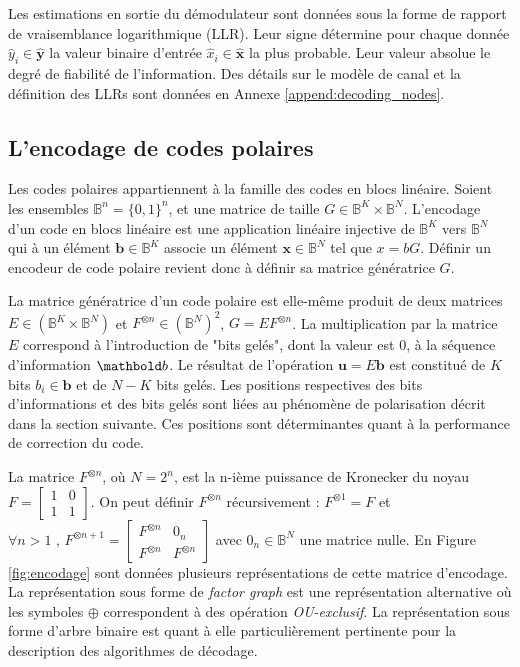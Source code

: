 Les estimations en sortie du démodulateur sont données sous la forme de rapport de vraisemblance logarithmique (LLR). Leur signe détermine pour chaque donnée $\hat{y}_i \in \mathbold{\hat{y}}$ la valeur binaire d'entrée $\hat{x}_i \in \mathbold{\hat{x}}$ la plus probable. Leur valeur absolue le degré de fiabilité de l'information. Des détails sur le modèle de canal et la définition des LLRs sont données en Annexe \ref{append:decoding_nodes}.

\subsection{L'encodage de codes polaires}
Les codes polaires appartiennent à la famille des codes en blocs linéaire. Soient les ensembles $\mathbb{B}^n = \{0,1\}^n$, et  une matrice de taille $G \in \mathbb{B}^K \times \mathbb{B}^N$. L'encodage d'un code en blocs linéaire est une application linéaire injective de $\mathbb{B}^K$ vers $\mathbb{B}^N$ qui à un élément $\mathbold{b} \in \mathbb{B}^K$ associe un élément $\mathbold{x} \in \mathbb{B}^N$ tel que $x=bG$. Définir un encodeur de code polaire revient donc à définir sa matrice génératrice $G$. 

La matrice génératrice d'un code polaire est elle-même produit de deux matrices $E \in (\mathbb{B}^K \times \mathbb{B}^N)$ et $F^{\otimes n}\in (\mathbb{B}^N)^2$, $G=EF^{\otimes n}$. La multiplication par la matrice $E$ correspond à l'introduction de "bits gelés", dont la valeur est $0$, à la séquence d'information $\mb{b}$. Le résultat de l'opération $\mathbold{u} = E\mathbold{b}$ est constitué de $K$ bits $b_i \in \mathbold{b}$ et de $N-K$ bits gelés. Les positions respectives des bits d'informations et des bits gelés sont liées au phénomène de polarisation décrit dans la section suivante. Ces positions sont déterminantes quant à la performance de correction du code.

La matrice $F^{\otimes n}$, où $N=2^n$, est la n-ième puissance de Kronecker du noyau $F=\left[\begin{smallmatrix} 1 & 0 \\ 1 & 1\end{smallmatrix}\right]$. On peut définir $F^{\otimes n}$ récursivement : $F^{\otimes 1} = F$ et $\forall {n > 1}\text{ , }{F^{\otimes n + 1}=\left[\begin{smallmatrix} F^{\otimes n} & 0_n \\ F^{\otimes n} & F^{\otimes n}\end{smallmatrix}\right]}$ avec $0_n \in \mathbb{B}^N$ une matrice nulle.   En Figure \ref{fig:encodage} sont données plusieurs représentations de cette matrice d'encodage. La représentation sous forme de \textit{factor graph} est une représentation alternative où les symboles $\oplus$ correspondent à des opération \textit{OU-exclusif}. La représentation sous forme d'arbre binaire est quant à elle particulièrement pertinente pour la description des algorithmes de décodage.

